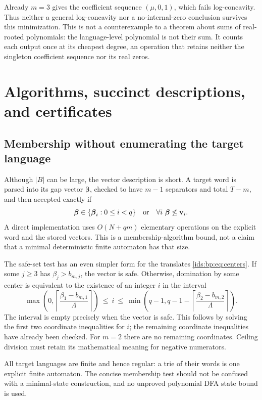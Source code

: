 \documentclass[11pt,letterpaper]{article}
\theoremstyle{definition}\newtheorem{definition}[theorem]{Definition}
\theoremstyle{remark}\newtheorem{remark}[theorem]{Remark}
\theoremstyle{definition}\newtheorem{question}[theorem]{Question}
\begin{document}
Already $m=3$ gives the coefficient sequence $(\mu,0,1)$, which fails
log-concavity. Thus neither a general log-concavity nor a no-internal-zero
conclusion survives this minimization.
This is not a counterexample to a theorem about sums of real-rooted
polynomials: the language-level polynomial is not their sum. It counts each
output once at its cheapest degree, an operation that retains neither the
singleton coefficient sequence nor its real zeros.

\section{Algorithms, succinct descriptions, and certificates}
\label{ids:bp:sec:algorithms}

\subsection{Membership without enumerating the target language}
Although $|B|$ can be large, the vector description is short. A target word is
parsed into its gap vector $\boldsymbol\beta$, checked to have $m-1$
separators and total $T-m$, and then accepted exactly if
\[
 \boldsymbol\beta\in\{\boldsymbol\beta_i:0\leq i<q\}
 \quad\hbox{or}\quad
 \forall i\ \boldsymbol\beta\not\leq\mathbf v_i.
\]
A direct implementation uses $O(N+qm)$ elementary operations on the explicit
word and the stored vectors. This is a membership-algorithm bound, not a
claim that a minimal deterministic finite automaton has that size.

The safe-set test has an even simpler form for the translates
\eqref{ids:bp:eq:centers}. If some $j\geq3$ has $\beta_j>b_{m,j}$, the vector
is safe. Otherwise, domination by some center is equivalent to the existence
of an integer $i$ in the interval
\begin{equation}
 \max\left(0,\left\lceil\frac{\beta_1-b_{m,1}}\Lambda\right\rceil\right)
 \ \leq\ i\ \leq\
 \min\left(q-1,q-1-\left\lceil\frac{\beta_2-b_{m,2}}\Lambda\right\rceil\right).
 \label{ids:bp:eq:interval-test}
\end{equation}
The interval is empty precisely when the vector is safe. This follows by
solving the first two coordinate inequalities for $i$; the remaining
coordinate inequalities have already been checked. For $m=2$ there are no
remaining coordinates. Ceiling division must retain its mathematical meaning
for negative numerators.

All target languages are finite and hence regular: a trie of their words is
one explicit finite automaton. The concise membership test should not be
confused with a minimal-state construction, and no unproved polynomial DFA
state bound is used.
\end{document}
